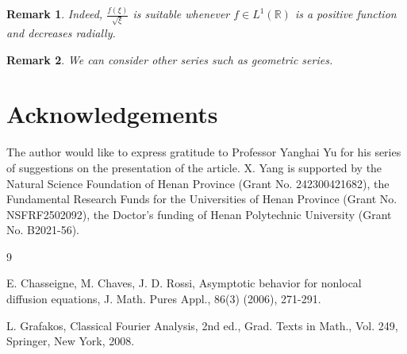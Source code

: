 \documentclass[12pt]{article}
\newcommand{\R}{\mathbb{R}}
\newtheorem{remark}{Remark}
\begin{document}
\begin{remark}
	Indeed, \(\frac{f(\xi)}{\sqrt{\xi}}\) is suitable whenever \(f\in L^1(\R)\) is a positive function and decreases radially.
\end{remark}

\begin{remark}	
	We can consider other series such as geometric series. 
\end{remark}

\section{Acknowledgements}

The author would like to express gratitude to Professor Yanghai Yu for his series of suggestions on the presentation of the article. X. Yang is supported by the Natural Science Foundation of Henan Province (Grant No. 242300421682), the Fundamental Research Funds for the Universities of Henan Province (Grant No. NSFRF2502092), the Doctor’s funding of Henan Polytechnic University (Grant No. B2021-56).

\begin{thebibliography}{9}

E. Chasseigne, M. Chaves, J. D. Rossi, Asymptotic behavior for nonlocal diffusion equations, J. Math. Pures Appl., 86(3) (2006), 271-291.

L. Grafakos, Classical Fourier Analysis, 2nd ed., Grad. Texts in Math., Vol. 249, Springer, New York, 2008.
\end{thebibliography}
\end{document}
